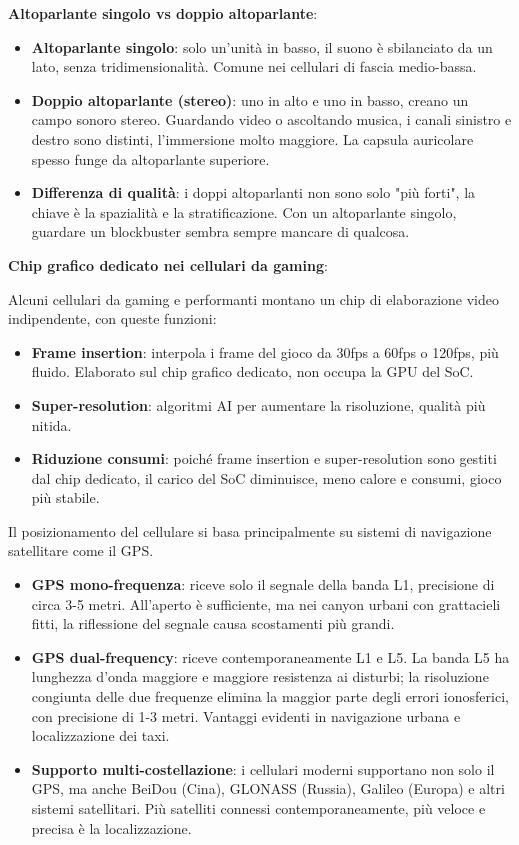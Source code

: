 \textbf{Altoparlante singolo vs doppio altoparlante}:

\begin{itemize}
  \item \textbf{Altoparlante singolo}: solo un'unità in basso, il suono è sbilanciato da un lato, senza tridimensionalità. Comune nei cellulari di fascia medio-bassa.
  \item \textbf{Doppio altoparlante (stereo)}: uno in alto e uno in basso, creano un campo sonoro stereo. Guardando video o ascoltando musica, i canali sinistro e destro sono distinti, l'immersione molto maggiore. La capsula auricolare spesso funge da altoparlante superiore.
  \item \textbf{Differenza di qualità}: i doppi altoparlanti non sono solo "più forti", la chiave è la spazialità e la stratificazione. Con un altoparlante singolo, guardare un blockbuster sembra sempre mancare di qualcosa.
\end{itemize}

\textbf{Chip grafico dedicato nei cellulari da gaming}:

Alcuni cellulari da gaming e performanti montano un chip di elaborazione video indipendente, con queste funzioni:

\begin{itemize}
  \item \textbf{Frame insertion}: interpola i frame del gioco da 30fps a 60fps o 120fps, più fluido. Elaborato sul chip grafico dedicato, non occupa la GPU del SoC.
  \item \textbf{Super-resolution}: algoritmi AI per aumentare la risoluzione, qualità più nitida.
  \item \textbf{Riduzione consumi}: poiché frame insertion e super-resolution sono gestiti dal chip dedicato, il carico del SoC diminuisce, meno calore e consumi, gioco più stabile.
\end{itemize}


Il posizionamento del cellulare si basa principalmente su sistemi di navigazione satellitare come il GPS.

\begin{itemize}
  \item \textbf{GPS mono-frequenza}: riceve solo il segnale della banda L1, precisione di circa 3-5 metri. All'aperto è sufficiente, ma nei canyon urbani con grattacieli fitti, la riflessione del segnale causa scostamenti più grandi.
  \item \textbf{GPS dual-frequency}: riceve contemporaneamente L1 e L5. La banda L5 ha lunghezza d'onda maggiore e maggiore resistenza ai disturbi; la risoluzione congiunta delle due frequenze elimina la maggior parte degli errori ionosferici, con precisione di 1-3 metri. Vantaggi evidenti in navigazione urbana e localizzazione dei taxi.
  \item \textbf{Supporto multi-costellazione}: i cellulari moderni supportano non solo il GPS, ma anche BeiDou (Cina), GLONASS (Russia), Galileo (Europa) e altri sistemi satellitari. Più satelliti connessi contemporaneamente, più veloce e precisa è la localizzazione.
\end{itemize}

